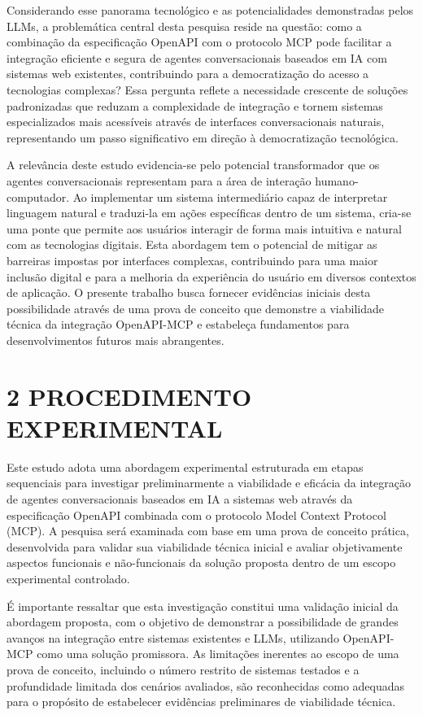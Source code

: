 \documentclass[
]{article}
\begin{document}
Considerando esse panorama tecnológico e as potencialidades demonstradas
pelos LLMs, a problemática central desta pesquisa reside na questão:
como a combinação da especificação OpenAPI com o protocolo MCP pode
facilitar a integração eficiente e segura de agentes conversacionais
baseados em IA com sistemas web existentes, contribuindo para a
democratização do acesso a tecnologias complexas? Essa pergunta reflete
a necessidade crescente de soluções padronizadas que reduzam a
complexidade de integração e tornem sistemas especializados mais
acessíveis através de interfaces conversacionais naturais, representando
um passo significativo em direção à democratização tecnológica.

A relevância deste estudo evidencia-se pelo potencial transformador que
os agentes conversacionais representam para a área de interação
humano-computador. Ao implementar um sistema intermediário capaz de
interpretar linguagem natural e traduzi-la em ações específicas dentro
de um sistema, cria-se uma ponte que permite aos usuários interagir de
forma mais intuitiva e natural com as tecnologias digitais. Esta
abordagem tem o potencial de mitigar as barreiras impostas por
interfaces complexas, contribuindo para uma maior inclusão digital e
para a melhoria da experiência do usuário em diversos contextos de
aplicação. O presente trabalho busca fornecer evidências iniciais desta
possibilidade através de uma prova de conceito que demonstre a
viabilidade técnica da integração OpenAPI-MCP e estabeleça fundamentos
para desenvolvimentos futuros mais abrangentes.

\section{2 PROCEDIMENTO EXPERIMENTAL}\label{procedimento-experimental}

Este estudo adota uma abordagem experimental estruturada em etapas
sequenciais para investigar preliminarmente a viabilidade e eficácia da
integração de agentes conversacionais baseados em IA a sistemas web
através da especificação OpenAPI combinada com o protocolo Model Context
Protocol (MCP). A pesquisa será examinada com base em uma prova de
conceito prática, desenvolvida para validar sua viabilidade técnica
inicial e avaliar objetivamente aspectos funcionais e não-funcionais da
solução proposta dentro de um escopo experimental controlado.

É importante ressaltar que esta investigação constitui uma validação
inicial da abordagem proposta, com o objetivo de demonstrar a
possibilidade de grandes avanços na integração entre sistemas existentes
e LLMs, utilizando OpenAPI-MCP como uma solução promissora. As
limitações inerentes ao escopo de uma prova de conceito, incluindo o
número restrito de sistemas testados e a profundidade limitada dos
cenários avaliados, são reconhecidas como adequadas para o propósito de
estabelecer evidências preliminares de viabilidade técnica.
\end{document}
